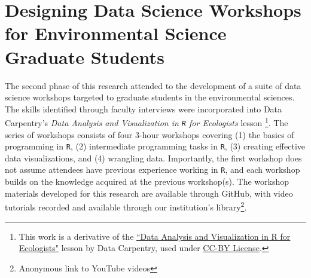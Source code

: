\documentclass[12pt]{article}
\begin{document}

\section{Designing Data Science Workshops for Environmental Science Graduate
Students}
\label{sec:workshops}

The second phase of this research attended to the development of a suite of data
science workshops targeted to graduate students in the environmental sciences.
The skills identified through faculty interviews were incorporated into Data
Carpentry's \emph{Data Analysis and Visualization in \texttt{R} for Ecologists}
lesson \citep{ecology_curriculum}\footnote{This
work is a derivative of the \href{https://datacarpentry.org/R-ecology-lesson}{``Data 
Analysis and Visualization in R for Ecologists"} lesson by Data Carpentry, used
under \href{https://creativecommons.org/licenses/by/4.0/}{CC-BY License}.}.
The series of workshops consists of four 3-hour workshops covering (1)
the basics of programming in \texttt{R}, (2) intermediate programming tasks in 
\texttt{R}, (3) creating effective data visualizations, and (4) wrangling data.
Importantly, the first workshop does not assume attendees have previous
experience working in \texttt{R}, and each workshop builds on the knowledge
acquired at the previous workshop(s). The workshop materials developed for this
research are available through GitHub, with video tutorials recorded and
available through our institution's library\footnote{Anonymous link to YouTube
videos}.

\end{document}
